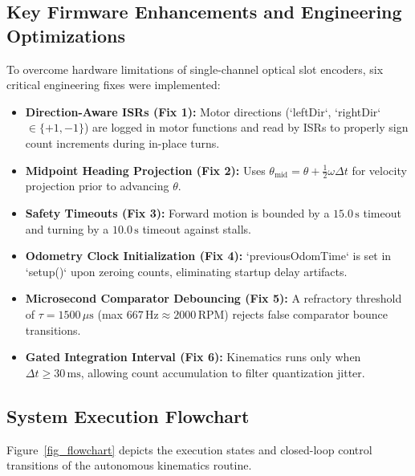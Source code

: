 \documentclass[11pt,a4paper]{article}
\begin{document}
\subsection{Key Firmware Enhancements and Engineering Optimizations}
To overcome hardware limitations of single-channel optical slot encoders, six critical engineering fixes were implemented:
\begin{itemize}[leftmargin=*,noitemsep,topsep=0pt]
    \item \textbf{Direction-Aware ISRs (Fix 1):} Motor directions (`leftDir`, `rightDir` $\in \{+1, -1\}$) are logged in motor functions and read by ISRs to properly sign count increments during in-place turns.
    \item \textbf{Midpoint Heading Projection (Fix 2):} Uses $\theta_{\text{mid}} = \theta + \frac{1}{2}\omega\Delta t$ for velocity projection prior to advancing $\theta$.
    \item \textbf{Safety Timeouts (Fix 3):} Forward motion is bounded by a $15.0\,\text{s}$ timeout and turning by a $10.0\,\text{s}$ timeout against stalls.
    \item \textbf{Odometry Clock Initialization (Fix 4):} `previousOdomTime` is set in `setup()` upon zeroing counts, eliminating startup delay artifacts.
    \item \textbf{Microsecond Comparator Debouncing (Fix 5):} A refractory threshold of $\tau = 1500\,\mu\text{s}$ (max $667\,\text{Hz} \approx 2000\,\text{RPM}$) rejects false comparator bounce transitions.
    \item \textbf{Gated Integration Interval (Fix 6):} Kinematics runs only when $\Delta t \ge 30\,\text{ms}$, allowing count accumulation to filter quantization jitter.
\end{itemize}

\newpage
\subsection{System Execution Flowchart}
Figure~\ref{fig_flowchart} depicts the execution states and closed-loop control transitions of the autonomous kinematics routine.
\end{document}
